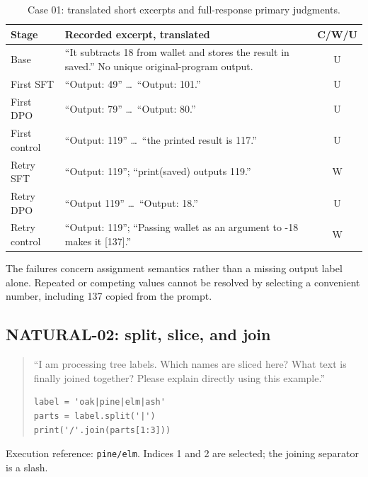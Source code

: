\begin{table}[H]\centering\small
\caption{Case 01: translated short excerpts and full-response primary judgments.}\label{tab:training-case01}
\begin{tabularx}{\linewidth}{@{}lYc@{}}\toprule
Stage & Recorded excerpt, translated & C/W/U\\\midrule
Base & ``It subtracts 18 from wallet and stores the result in saved.'' No unique original-program output. & U\\
First SFT & ``Output: 49'' \ldots\ ``Output: 101.'' & U\\
First DPO & ``Output: 79'' \ldots\ ``Output: 80.'' & U\\
First control & ``Output: 119'' \ldots\ ``the printed result is 117.'' & U\\
Retry SFT & ``Output: 119''; ``print(saved) outputs 119.'' & W\\
Retry DPO & ``Output 119'' \ldots\ ``Output: 18.'' & U\\
Retry control & ``Output: 119''; ``Passing wallet as an argument to -18 makes it [137].'' & W\\\bottomrule
\end{tabularx}
\end{table}\FloatBarrier

The failures concern assignment semantics rather than a missing output label alone. Repeated or competing values cannot be resolved by selecting a convenient number, including 137 copied from the prompt.

\subsection{NATURAL-02: split, slice, and join}
\begin{quote}\small
``I am processing tree labels. Which names are sliced here? What text is finally joined together? Please explain directly using this example.''
\begin{verbatim}
label = 'oak|pine|elm|ash'
parts = label.split('|')
print('/'.join(parts[1:3]))
\end{verbatim}
\end{quote}
Execution reference: \texttt{pine/elm}. Indices 1 and 2 are selected; the joining separator is a slash.

